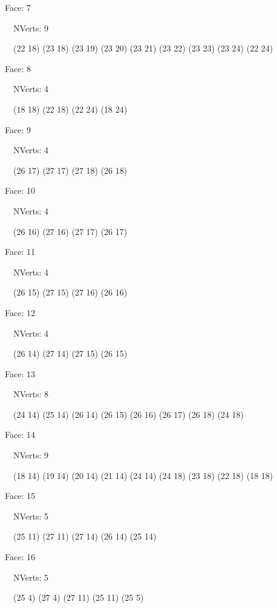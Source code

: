 \documentclass{article}
\begin{document}
{\footnotesize 

Face: 7

\   \    NVerts: 9

 \   \   (22 18) (23 18) (23 19) (23 20) (23 21) (23 22) (23 23) (23 24) (22 24)}

{\footnotesize 

Face: 8

\   \    NVerts: 4

 \   \   (18 18) (22 18) (22 24) (18 24)}

{\footnotesize 

Face: 9

\   \    NVerts: 4

 \   \   (26 17) (27 17) (27 18) (26 18)}

{\footnotesize 

Face: 10

\   \    NVerts: 4

 \   \   (26 16) (27 16) (27 17) (26 17)}

{\footnotesize 

Face: 11

\   \    NVerts: 4

 \   \   (26 15) (27 15) (27 16) (26 16)}

{\footnotesize 

Face: 12

\   \    NVerts: 4

 \   \   (26 14) (27 14) (27 15) (26 15)}

{\footnotesize 

Face: 13

\   \    NVerts: 8

 \   \   (24 14) (25 14) (26 14) (26 15) (26 16) (26 17) (26 18) (24 18)}

{\footnotesize 

Face: 14

\   \    NVerts: 9

 \   \   (18 14) (19 14) (20 14) (21 14) (24 14) (24 18) (23 18) (22 18) (18 18)}

{\footnotesize 

Face: 15

\   \    NVerts: 5

 \   \   (25 11) (27 11) (27 14) (26 14) (25 14)}

{\footnotesize 

Face: 16

\   \    NVerts: 5

 \   \   (25 4) (27 4) (27 11) (25 11) (25 5)}
\end{document}
